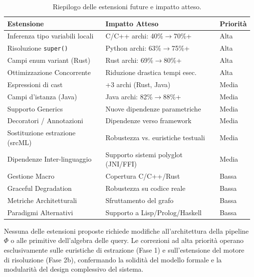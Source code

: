 \begin{table}[ht]
  \centering
  \caption{Riepilogo delle estensioni future e impatto atteso.}
  \label{tab:priorita-future}
  \begin{tabular}{l l l}
    \hline
    \textbf{Estensione} & \textbf{Impatto Atteso} & \textbf{Priorità} \\
    \hline
    Inferenza tipo variabili locali & C/C++ archi: 40\%$\to$70\%+ & Alta \\
    Risoluzione \texttt{super()}    & Python archi: 63\%$\to$75\%+ & Alta \\
    Campi enum variant (Rust)       & Rust archi: 69\%$\to$80\%+   & Alta \\
    Ottimizzazione Concorrente      & Riduzione drastica tempi esec. & Alta \\
    Espressioni di cast             & +3 archi (Rust, Java)          & Media \\
    Campi d'istanza (Java)          & Java archi: 82\%$\to$88\%+   & Media \\
    Supporto Generics               & Nuove dipendenze parametriche  & Media \\
    Decoratori / Annotazioni        & Dipendenze verso framework     & Media \\
    Sostituzione estrazione (srcML) & Robustezza vs. euristiche testuali & Media \\
    Dipendenze Inter-linguaggio     & Supporto sistemi polyglot (JNI/FFI) & Media \\
    Gestione Macro                  & Copertura C/C++/Rust           & Bassa \\
    Graceful Degradation            & Robustezza su codice reale     & Bassa \\
    Metriche Architetturali         & Sfruttamento del grafo         & Bassa \\
    Paradigmi Alternativi           & Supporto a Lisp/Prolog/Haskell & Bassa \\
    \hline
  \end{tabular}
\end{table}

Nessuna delle estensioni proposte richiede modifiche all'architettura
della pipeline $\Phi$ o alle primitive dell'algebra delle query. Le
correzioni ad alta priorità operano esclusivamente sulle euristiche
di estrazione (Fase 1) e sull'estensione del motore di risoluzione
(Fase 2b), confermando la solidità del modello formale e la
modularità del design complessivo del sistema.
